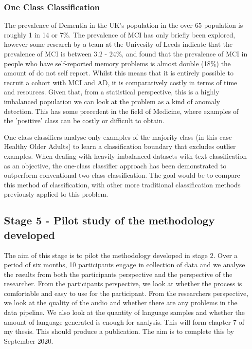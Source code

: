 \documentclass[11pt]{article}
\begin{document}
\subsubsection*{One Class Classification}
The prevalence of Dementia in the UK's population in the over 65 population is roughly 1 in 14 or 7\%. The prevalence of MCI has only briefly been explored, however some research by a team at the Univesity of Leeds indicate that the prevalence of MCI is between 3.2 - 24\%, and found that the prevalence of MCI in people who have self-reported memory problems is almost double (18\%) the amount of do not self report. Whilst this means that it is entirely possible to recruit a cohort with MCI and AD, it is comparatively costly in terms of time and resources. Given that, from a statistical perspective, this is a highly imbalanced population we can look at the problem as a kind of anomaly detection. This has some precedent in the field of Medicine, where examples of the 'positive' class can be costly or difficult to obtain. 
\par 
One-class classifiers analyse only examples of the majority class (in this case - Healthy Older Adults) to learn a classification boundary that excludes outlier examples. When dealing with heavily imbalanced datasets with text classification as an objective, the one-class classifier approach has been demonstrated to outperform conventional two-class classification. The goal would be to compare this method of classification, with other more traditional classification methods previously applied to this problem. 

\subsection*{Stage 5 - Pilot study of the methodology developed}
The aim of this stage is to pilot the methodology developed in stage 2. Over a period of six months, 10 participants engage in collection of data and we analyse the results from both the participants perspective and the perspective of the researcher. From the participants perspective, we look at whether the process is comfortable and easy to use for the participant. From the researchers perspective, we look at the quality of the audio and whether there are any problems in the data pipeline. We also look at the quantity of language samples and whether the amount of language generated is enough for analysis. This will form chapter 7 of my thesis. This should produce a publication. The aim is to complete this by September 2020.
\end{document}
